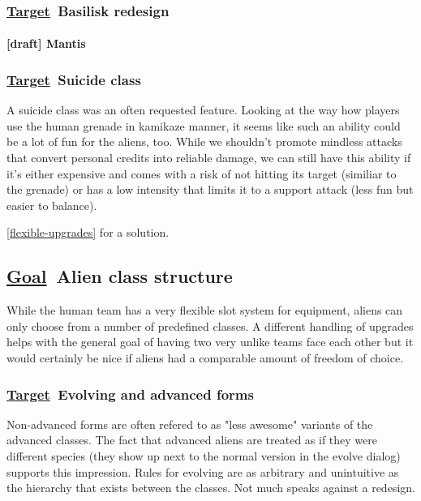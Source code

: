 \documentclass{scrartcl}
\newcommand{\goal}     [0]{\textbf{\underline{Goal}\ }}
\newcommand{\target}   [0]{\textbf{\underline{Target}\ }}
\newcommand{\draft}    [0]{\textcolor{draft}    {\textbf{[draft] }}}
\begin{document}
\subsubsection{\target Basilisk redesign}

\paragraph{\draft Mantis}
\label{mantis}

\subsubsection{\target Suicide class}
\label{suicide-class}

A suicide class was an often requested feature. Looking at the way how players use the human grenade in kamikaze manner, it seems like such an ability could be a lot of fun for the aliens, too. While we shouldn't promote mindless attacks that convert personal credits into reliable damage, we can still have this ability if it's either expensive and comes with a risk of not hitting its target (similiar to the grenade) or has a low intensity that limits it to a support attack (less fun but easier to balance).

\ref{flexible-upgrades} for a solution.

\subsection{\goal Alien class structure}

While the human team has a very flexible slot system for equipment, aliens can only choose from a number of predefined classes. A different handling of upgrades helps with the general goal of having two very unlike teams face each other but it would certainly be nice if aliens had a comparable amount of freedom of choice.

\subsubsection{\target Evolving and advanced forms}

Non-advanced forms are often refered to as "less awesome" variants of the advanced classes. The fact that advanced aliens are treated as if they were different species (they show up next to the normal version in the evolve dialog) supports this impression. Rules for evolving are as arbitrary and unintuitive as the hierarchy that exists between the classes. Not much speaks against a redesign.
\end{document}
